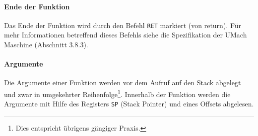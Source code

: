 \paragraph{Ende der Funktion}

Das Ende der Funktion wird durch den Befehl \texttt{RET} markiert (von
\glqq return\grqq). Für mehr Informationen betreffend dieses Befehls siehe die
Spezifikation der UMach Maschine (Abschnitt 3.8.3).


\paragraph{Argumente}

Die Argumente einer Funktion werden vor dem Aufruf auf den Stack abgelegt und
zwar in umgekehrter Reihenfolge\footnote{Dies entspricht übrigens gängiger
Praxis.}. Innerhalb der Funktion werden die Argumente mit Hilfe des Registers
\texttt{SP} (Stack Pointer) und eines Offsets abgelesen.

